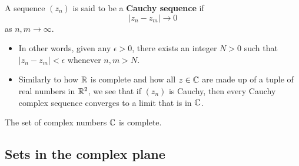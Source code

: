 \documentclass[11pt,a4paper]{book}
\begin{document}
\begin{definition}
    A sequence \( ({z}_{n})  \) is said to be a \textbf{Cauchy sequence} if 
    \[  | {z}_{n} - {z}_{m} |  \to 0  \]
    as \( n,m \to \infty  \).
\end{definition}

\begin{itemize}
    \item In other words, given any \( \epsilon > 0  \), there exists an integer \( N > 0  \) such that \( | {z}_{n} - {z}_{m} | < \epsilon  \) whenever \( n,m > N  \).
    \item Similarly to how \( \mathbb{R}  \) is complete and how all \( z \in \mathbb{C}   \) are made up of a tuple of real numbers in \( \mathbb{R}^{2} \), we see that if \( ({z}_{n}) \) is Cauchy, then every Cauchy complex sequence converges to a limit that is in \( \mathbb{C}  \).
\end{itemize}

\begin{theorem}[ ]
    The set of complex numbers \( \mathbb{C}  \) is complete.
\end{theorem}

\subsection{Sets in the complex plane}
\end{document}
